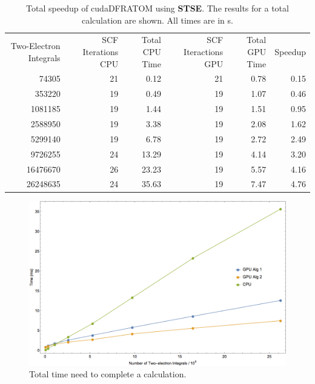 \begin{table}[h!]
\begin{center}
\caption[Total speedup of alg2]{Total speedup of cudaDFRATOM using \textbf{STSE}. The results for a total calculation are shown. All times are in s.}
\label{tab:totalprofalg2}
\begin{tabular}{rrrrrr}
\toprule
	\multirow{2}{3cm}{Two-Electron Integrals}	&	\multirow{2}{3cm}{SCF Iterations CPU}	&	\multirow{2}{2cm}{Total CPU Time}		&	\multirow{2}{3cm}{SCF Iteractions GPU}		&	\multirow{2}{2cm}{Total GPU Time}		&	\multirow{2}{*}{Speedup}	\\
	\\
\midrule
	74305	&	21	&	0.12		&	21	&	0.78	&	0.15	\\
	353220	&	19	&	0.49		&	19	&	1.07	&	0.46	\\
	1081185	&	19	&	1.44		&	19	&	1.51	&	0.95	\\
	2588950	&	19	&	3.38		&	19	&	2.08	&	1.62	\\
	5299140	&	19	&	6.78		&	19	&	2.72	&	2.49	\\
	9726255	&	24	&	13.29	&	19	&	4.14	&	3.20	\\
	16476670	&	26	&	23.23	&	19	&	5.57	&	4.16	\\
	26248635	&	24	&	35.63	&	19	&	7.47	&	4.76	\\
\bottomrule
\end{tabular}
\end{center}
\end{table}

\begin{figure}[h!]
\includegraphics[width=1\textwidth]{Figures/totaltimeprof.png}
\caption[Total time need to complete a calculation.]
{Total time need to complete a calculation.}
\label{fig:totaltimeprof}
\end{figure}


